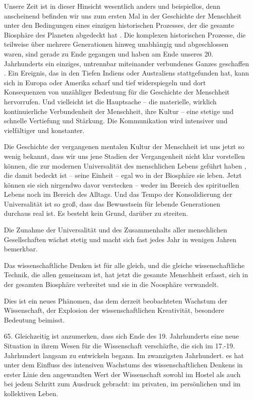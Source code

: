 \documentclass[11pt,a4paper]{book}
\begin{document}
Unsere Zeit ist in dieser Hinsicht wesentlich anders und beispiellos, denn anscheinend befinden wir uns zum ersten Mal in der Geschichte der Menschheit unter den Bedingungen eines einzigen historischen Prozesses, der die gesamte Biosphäre des Planeten abgedeckt hat . Die komplexen historischen Prozesse, die teilweise über mehrere Generationen hinweg unabhängig und abgeschlossen waren, sind gerade zu Ende gegangen und haben am Ende unseres 20. Jahrhunderts ein einziges, untrennbar miteinander verbundenes Ganzes geschaffen . Ein Ereignis, das in den Tiefen Indiens oder Australiens stattgefunden hat, kann sich in Europa oder Amerika scharf und tief widerspiegeln und dort Konsequenzen von unzähliger Bedeutung für die Geschichte der Menschheit hervorrufen. Und vielleicht ist die Hauptsache -- die materielle, wirklich kontinuierliche Verbundenheit der Menschheit, ihre Kultur -- eine stetige und schnelle Vertiefung und Stärkung. Die Kommunikation wird intensiver und vielfältiger und konstanter.



Die Geschichte der vergangenen mentalen Kultur der Menschheit ist uns jetzt so wenig bekannt, dass wir uns jene Stadien der Vergangenheit nicht klar vorstellen können, die zur modernen Universalität des menschlichen Lebens geführt haben , die damit bedeckt ist -- seine Einheit -- egal wo in der Biosphäre sie leben. Jetzt können sie sich nirgendwo davor verstecken -- weder im Bereich des spirituellen Lebens noch im Bereich des Alltags. Und das Tempo der Konsolidierung der Universalität ist so groß, dass das Bewusstsein für lebende Generationen durchaus real ist. Es besteht kein Grund, darüber zu streiten.



Die Zunahme der Universalität und des Zusammenhalts aller menschlichen Gesellschaften wächst stetig und macht sich fast jedes Jahr in wenigen Jahren bemerkbar.



Das wissenschaftliche Denken ist für alle gleich, und die gleiche wissenschaftliche Technik, die allen gemeinsam ist, hat jetzt die gesamte Menschheit erfasst, sich in der gesamten Biosphäre verbreitet und sie in die Noosphäre verwandelt.



Dies ist ein neues Phänomen, das dem derzeit beobachteten Wachstum der Wissenschaft, der Explosion der wissenschaftlichen Kreativität, besondere Bedeutung beimisst.



65. Gleichzeitig ist anzumerken, dass sich Ende des 19. Jahrhunderts eine neue Situation in ihrem Wesen für die Wissenschaft verschärfte, die sich im 17.-19. Jahrhundert langsam zu entwickeln begann. Im zwanzigsten Jahrhundert. es hat unter dem Einfluss des intensiven Wachstums des wissenschaftlichen Denkens in erster Linie den angewandten Wert der Wissenschaft sowohl im Hostel als auch bei jedem Schritt zum Ausdruck gebracht: im privaten, im persönlichen und im kollektiven Leben.
\end{document}
